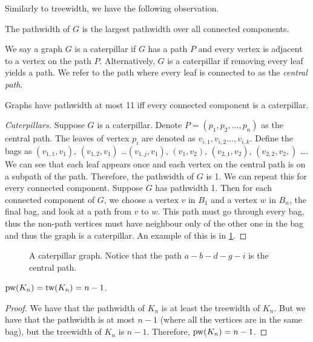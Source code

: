 Similarly to treewidth, we have the following observation.
\begin{lemma}
	The pathwidth of $G$ is the largest pathwidth over all connected components.
\end{lemma}
We say a graph $G$ is a caterpillar if $G$ has a path $P$ and every vertex is adjacent to a vertex on the path $P$. Alternatively, $G$ is a caterpillar if removing every leaf yields a path. We refer to the path where every leaf is connected to as the \textit{central path}.
\begin{theorem}[Caterpillars]
	Graphs have pathwidth at most 11 iff every connected component is a caterpillar.
\end{theorem}
\begin{proof}[Caterpillars]
	Suppose $G$ is a caterpillar. 
	Denote $P =\left( p_1, p_2, \dots, p_n\right)$ as the central path. The leaves of vertex $p_i$ are denoted as $v_{i, 1}, v_{i, 2} \dots, v_{i, k}$. Define the bags as $(v_{1, 1}, v_1)$, $(v_{1, 2}, v_1)$ \dots $(v_{1, j}, v_1)$,  $(v_1, v_2)$, $(v_{2, 1}, v_2)$, $(v_{2,2}, v_2,)$ \dots. We can see that each leaf appears once and each vertex on the central path is on a subpath of the path. Therefore, the pathwidth of $G$ is 1. We can repeat this for every connected component.
	Suppose $G$ has pathwidth 1. Then for each connected component of $G$, we choose a vertex $v$ in $B_1$ and a vertex $w$ in $B_n$, the final bag, and look at a path from $v$ to $w$. This path must go through every bag, thus the non-path vertices must have neighbour only of the other one in the bag and thus the graph is a caterpillar. An example of this is in \cref{fig:caterpillar}.
\end{proof}
	\begin{figure}[h]
		\centering
		
		\caption{A caterpillar graph. Notice that the path $a - b - d - g - i$ is the central path.}
		\label{fig:caterpillar}
	\end{figure}


\begin{example}
	$\text{pw}(K_n) = \text{tw}(K_n) = n - 1$. 
\end{example}
\begin{proof}
	We have that the pathwidth of $K_n$ is at least the treewidth of $K_n$. But we have that the pathwidth is at most $n- 1$ (where all the vertices are in the same bag), but the treewidth of $K_n$ is $n - 1$. Therefore, $\text{pw}(K_n) = n - 1$. 
\end{proof}

